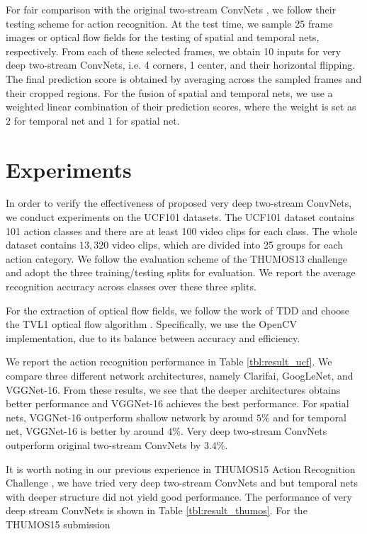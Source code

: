\documentclass[10pt,twocolumn,letterpaper]{article}
\begin{document}
For fair comparison with the original two-stream ConvNets \cite{SimonyanZ14}, we follow their testing scheme for action recognition. At the test time, we sample 25 frame images or optical flow fields for the testing of spatial and temporal nets, respectively. From each of these selected frames, we obtain 10 inputs for very deep two-stream ConvNets, i.e. 4 corners, 1 center, and their horizontal flipping. The final prediction score is obtained by averaging across the sampled frames and their cropped regions. For the fusion of spatial and temporal nets, we use a weighted linear combination of their prediction scores, where the weight is set as $2$ for temporal net and $1$ for spatial net.

\section{Experiments}
\label{sec:experiment}

In order to verify the effectiveness of proposed very deep two-stream ConvNets, we conduct experiments on the UCF101 \cite{Soomro12} datasets. The UCF101 dataset contains 101 action classes and there are at least 100 video clips for each class. The whole dataset contains $13,320$ video clips, which are divided into 25 groups for each action category. We follow the evaluation scheme of the THUMOS13 challenge \cite{THUMOS13} and adopt the three training/testing splits for evaluation. We report the average recognition accuracy across classes over these three splits.

For the extraction of optical flow fields, we follow the work of TDD \cite{WangQT15a} and choose the TVL1 optical flow algorithm \cite{ZachPB07}. Specifically, we use the OpenCV implementation, due to its balance between accuracy and efficiency.

We report the action recognition performance in Table \ref{tbl:result_ucf}. We compare three different network architectures, namely Clarifai, GoogLeNet, and VGGNet-16. From these results, we see that the deeper architectures obtains better performance and VGGNet-16 achieves the best performance. For spatial nets, VGGNet-16 outperform shallow network by around $5\%$ and for temporal net, VGGNet-16 is better by around $4\%$. Very deep two-stream ConvNets outperform original two-stream ConvNets by $3.4\%$. 

It is worth noting in our previous experience \cite{WangWXQ15} in THUMOS15 Action Recognition Challenge \cite{THUMOS15}, we have tried very deep two-stream ConvNets and but temporal nets with deeper structure did not yield good performance. The performance of very deep stream ConvNets is shown in Table \ref{tbl:result_thumos}. For the THUMOS15 submission
\end{document}
